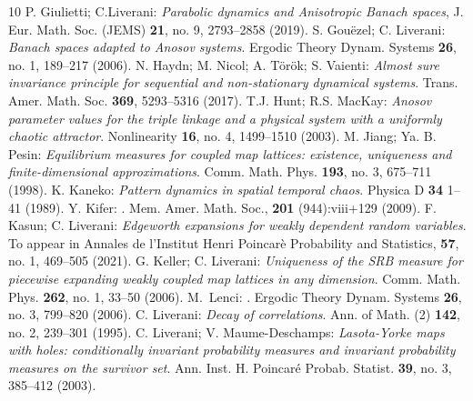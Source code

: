 \begin{thebibliography}{10}
 P. Giulietti; C.Liverani:  {\em Parabolic dynamics and Anisotropic Banach spaces},  J. Eur. Math. Soc. (JEMS) {\bf 21}, no. 9, 2793--2858 (2019). 
 S. Gou\"ezel; C. Liverani: {\em Banach spaces adapted to Anosov systems}. Ergodic Theory Dynam. Systems {\bf 26}, no. 1, 189--217 (2006).
 N. Haydn; M. Nicol; A. T\"or\"ok; S. Vaienti: {\em Almost sure invariance principle for sequential and non-stationary dynamical systems}. Trans. Amer. Math. Soc. {\bf 369}, 5293--5316 (2017).
 T.J. Hunt; R.S. MacKay: {\em Anosov parameter values for the triple linkage and a physical system with a uniformly chaotic attractor}. Nonlinearity {\bf 16}, no. 4, 1499--1510  (2003).
 M. Jiang; Ya. B. Pesin: {\em Equilibrium measures for coupled map lattices: existence, uniqueness and finite-dimensional approximations}. Comm. Math. Phys. {\bf 193}, no. 3, 675--711 (1998).
 K. Kaneko: {\em Pattern dynamics in spatial temporal chaos}. Physica D {\bf 34} 1--41 (1989).
 Y. Kifer:
.
\newblock  Mem. Amer. Math. Soc., {\bf 201} (944):viii+129 (2009).
 F. Kasun; C. Liverani: {\em Edgeworth expansions for weakly dependent random variables}. To appear in Annales de l'Institut Henri Poincar\`e Probability and Statistics, {\bf  57}, no. 1, 469--505 (2021).
 G. Keller; C. Liverani: {\em Uniqueness of the SRB measure for piecewise expanding weakly coupled map lattices in any dimension}. Comm. Math. Phys. {\bf  262}, no. 1, 33--50 (2006). 
 M.~Lenci:
.  Ergodic Theory Dynam. Systems {\bf 26}, no. 3, 799--820 (2006).
 C. Liverani: {\em Decay of correlations}. Ann. of Math. (2) {\bf 142}, no. 2, 239--301 (1995).
 C. Liverani; V. Maume-Deschamps:
{\em Lasota-Yorke maps with holes: conditionally invariant probability measures and invariant probability measures on the survivor set}. Ann. Inst. H. Poincar\'e Probab. Statist. {\bf 39}, no. 3, 385--412 (2003).

\end{thebibliography}
